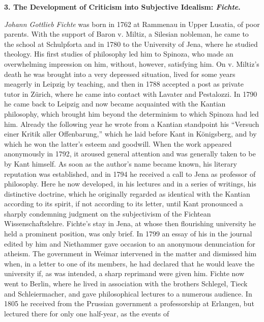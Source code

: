 \divrule

\begin{center}
  \textbf{3. The Development of Criticism into Subjective Idealism: \emph{Fichte}.}
\end{center}

\emph{Johann Gottlieb Fichte} was born in 1762 at Rammenau in Upper
Lusatia, of poor parents. With the support of Baron v. Miltiz, a
Silesian nobleman, he came to the school at Schulpforta and in 1780 to
the University of Jena, where he studied theology. His first studies of
philosophy led him to Spinoza, who made an overwhelming impression on
him, without, however, satisfying him. On v. Miltiz's death he was
brought into a very depressed situation, lived for some years meagerly
in Leipzig by teaching, and then in 1788 accepted a post as private
tutor in Zürich, where he came into contact with Lavater and
Pestalozzi. In 1790 he came back to Leipzig and now became acquainted
with the Kantian philosophy, which brought him beyond the determinism
to which Spinoza had led him. Already the following year he wrote from
a Kantian standpoint his ``Versuch einer Kritik aller Offenbarung,''
which he laid before Kant in Königsberg, and by which he won the
latter's esteem and goodwill. When the work appeared anonymously in
1792, it aroused general attention and was generally taken to be by
Kant himself. As soon as the author's name became known, his literary
reputation was established, and in 1794 he received a call to Jena as
professor of philosophy. Here he now developed, in his lectures and in
a series of writings, his distinctive doctrine, which he originally
regarded as identical with the Kantian according to its spirit, if not
according to its letter, until Kant pronounced a sharply condemning
judgment on the subjectivism of the Fichtean Wissenschaftslehre.
Fichte's stay in Jena, at whose then flourishing university he held a
prominent position, was only brief. In 1799 an essay of his in the
journal edited by him and Niethammer gave occasion to an anonymous
denunciation for atheism. The government in Weimar intervened in the
matter and dismissed him when, in a letter to one of its members, he
had declared that he would leave the university if, as was intended, a
sharp reprimand were given him. Fichte now went to Berlin,
where he lived in association with the brothers Schlegel, Tieck and
Schleiermacher, and gave philosophical lectures to a numerous audience.
In 1805 he received from the Prussian government a professorship at
Erlangen, but lectured there for only one half-year, as the events of
